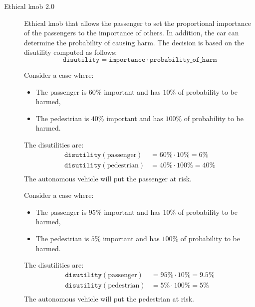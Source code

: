 \begin{description}
    \item[Ethical knob 2.0] 
        Ethical knob that allows the passenger to set the proportional importance of the passengers to the importance of others. In addition, the car can determine the probability of causing harm. The decision is based on the disutility computed as follows:
        \[ \texttt{disutility} = \texttt{importance} \cdot \texttt{probability\_of\_harm} \]

        \begin{example}
            Consider a case where:
            \begin{itemize}
                \item The passenger is $60\%$ important and has $10\%$ of probability to be harmed,
                \item The pedestrian is $40\%$ important and has $100\%$ of probability to be harmed.
            \end{itemize}
            The disutilities are:
            \[
                \begin{split}
                    \texttt{disutility}(\text{passenger}) &= 60\% \cdot 10\% = 6\% \\
                    \texttt{disutility}(\text{pedestrian}) &= 40\% \cdot 100\% = 40\% \\
                \end{split}
            \]
            The autonomous vehicle will put the passenger at risk.
        \end{example}

        \begin{example}
            Consider a case where:
            \begin{itemize}
                \item The passenger is $95\%$ important and has $10\%$ of probability to be harmed,
                \item The pedestrian is $5\%$ important and has $100\%$ of probability to be harmed.
            \end{itemize}
            The disutilities are:
            \[
                \begin{split}
                    \texttt{disutility}(\text{passenger}) &= 95\% \cdot 10\% = 9.5\% \\
                    \texttt{disutility}(\text{pedestrian}) &= 5\% \cdot 100\% = 5\% \\
                \end{split}
            \]
            The autonomous vehicle will put the pedestrian at risk.
        \end{example}


\end{description}
